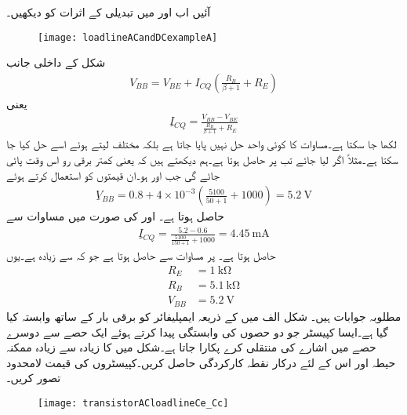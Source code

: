 آئیں اب  اور   میں تبدیلی کے اثرات کو دیکھیں۔
%
\begin{figure}
\centering
\texttt{[image: loadlineACandDCexampleA]}
\caption{}
\label{شکل_ٹرانزسٹر_بدلتی_رو_بار_خط_مثال_الف}
\end{figure}
%
شکل  کے داخلی جانب 
\begin{align}\label{مساوات_ٹرانزسٹر_اسباب_مثال}
V_{BB}=V_{BE}+I_{CQ} \left(\frac{R_B}{\beta+1}+R_E \right)
\end{align}
یعنی
\begin{align}\label{مساوات_ٹرانزسٹر_اسباب_مثال_ب}
ِI_{CQ}=\frac{V_{BB}-V_{BE}}{\frac{R_B}{\beta+1}+R_E}
\end{align}
لکھا جا سکتا ہے۔مساوات  کا کوئی واحد حل نہیں پایا جاتا ہے بلکہ مختلف  لیتے ہوئے اسے حل کیا جا سکتا ہے۔مثلاً اگر  لیا جائے تب  پر  حاصل ہوتا ہے۔ہم دیکھتے ہیں کہ  یعنی کمتر برقی رو اس وقت پائی جائے گی جب  اور  ہو۔ان قیمتوں کو استعمال کرتے ہوئے
\begin{align*}
ِV_{BB}=0.8+4 \times 10^{-3} \left(\frac{5100}{50+1}+1000 \right)=\SI{5.2}{\volt}
\end{align*}
حاصل ہوتا ہے۔ اور  کی صورت میں مساوات  سے
\begin{align*}
ِI_{CQ}=\frac{5.2-0.6}{\frac{5100}{150+1}+1000}=\SI{4.45}{\milli \ampere}
\end{align*}
حاصل ہوتا ہے۔ پر مساوات  سے  حاصل ہوتا ہے جو کہ  سے زیادہ ہے۔یوں
\begin{align*}
R_E&=\SI{1}{\kilo \ohm}\\
R_B&=\SI{5.1}{\kilo \ohm}\\
V_{BB}&=\SI{5.2}{\volt}
\end{align*}
مطلوبہ جوابات ہیں۔ 
شکل  الف میں  کے ذریعہ ایمپلیفائر کو برقی بار  کے ساتھ وابستہ کیا گیا ہے۔ایسا کپیسٹر جو دو حصوں کی وابستگی پیدا کرتے ہوئے ایک حصے سے دوسرے حصے میں اشارے کی منتقلی کرے  پکارا جاتا ہے۔شکل میں  کا زیادہ سے زیادہ ممکنہ حیطہ اور اس کے لئے درکار نقطہ کارکردگی حاصل کریں۔کپیسٹروں کی قیمت لامحدود تصور کریں۔ 
\begin{figure}
\centering
\texttt{[image: transistorACloadlineCe\_Cc]}
\caption{}
\label{شکل_ٹرانزسٹر_بدلتی_رو_بار_خط_مثال_ب}
\end{figure}

